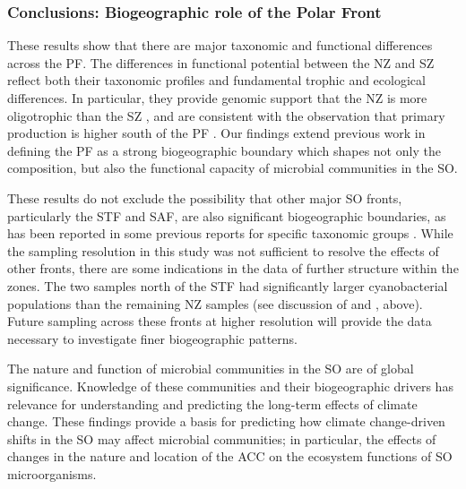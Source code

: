 \subsubsection{Conclusions: Biogeographic role of the Polar Front}

These results show that there are major taxonomic and functional differences across the \ac{PF}.
The differences in functional potential between the \ac{NZ} and \ac{SZ} reflect both their taxonomic profiles and fundamental trophic and ecological differences.
In particular, they provide genomic support that the \ac{NZ} is more oligotrophic than the \ac{SZ} \cite{Pollard:2002vr,Giovannoni:2005ib,Alonso:2006dj,Lauro:2009gx}, and are consistent with the observation that primary production is higher south of the \ac{PF} \cite{Strutton:2000ta,Williams:2010jy}.
Our findings extend previous work in defining the \ac{PF} as a strong biogeographic boundary which shapes not only the composition, but also the functional capacity of microbial communities in the \ac{SO}.

These results do not exclude the possibility that other major \ac{SO} fronts, particularly the \ac{STF} and \ac{SAF}, are also significant biogeographic boundaries, as has been reported in some previous reports for specific taxonomic groups \citep[e.g.][]{Abell:2005ji}.
While the sampling resolution in this study was not sufficient to resolve the effects of other fronts, there are some indications in the data of further structure within the zones.
The two samples north of the \ac{STF} had significantly larger cyanobacterial populations than the remaining \ac{NZ} samples (see discussion of  and , above).
Future sampling across these fronts at higher resolution will provide the data necessary to investigate finer biogeographic patterns.

The nature and function of microbial communities in the \ac{SO} are of global significance.
Knowledge of these communities and their biogeographic drivers has relevance for understanding and predicting the long-term effects of climate change.
These findings provide a basis for predicting how climate change-driven shifts in the \ac{SO} may affect microbial communities; in particular, the effects of changes in the nature and location of the \ac{ACC} on the ecosystem functions of \ac{SO} microorganisms.
